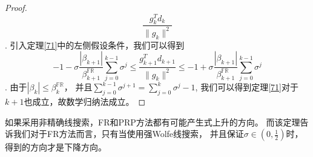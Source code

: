 \begin{proof}
\begin{equation}
                \displaystyle\frac{g_{k}^Td_k}{\|g_{k}\|^2}
            \nonumber
            \end{equation}.
            引入定理\ref{71}中的左侧假设条件，我们可以得到
            \begin{equation}
                -1 - \sigma \displaystyle\frac{|\beta_{k+1}|}{\beta_{k+1}^{\mathbb{FR}}}
                \displaystyle\sum^{k-1}_{j=0}\sigma^j
                \leq
                \displaystyle\frac{g_{k+1}^Td_{k+1}}{\|g_{k}\|^2}
                \leq
                -1 + \sigma \displaystyle\frac{|\beta_{k+1}|}{\beta_{k+1}^{\mathbb{FR}}}
                \displaystyle\sum^{k-1}_{j=0}\sigma^j 
            \nonumber
            \end{equation}.
            由于$|\beta_k| \leq \beta_k^{\mathbb{FR}}$，
            并且$\displaystyle\sum^{k-1}_{j=0}\sigma^{j+1} = \displaystyle\sum^{k}_{j=0}\sigma^{j} - 1 $,
            我们可以得到定理\ref{71}对于$k+1$也成立，故数学归纳法成立。
        \end{proof}
        
            如果采用非精确线搜索，FR和PRP方法都有可能产生式上升的方向。
            而该定理告诉我们对于FR方法而言，只有当使用强Wolfe线搜索，
            并且保证$\sigma\in(0,\frac{1}{2})$时，得到的方向才是下降方向。
            
